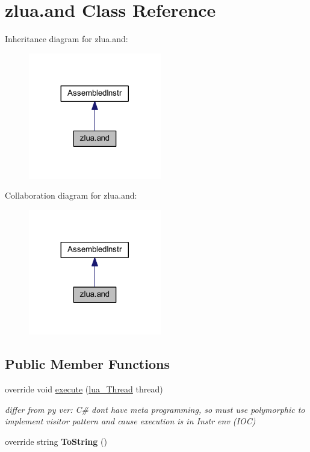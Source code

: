 \hypertarget{classzlua_1_1and}{}\section{zlua.\+and Class Reference}
\label{classzlua_1_1and}


Inheritance diagram for zlua.\+and\+:
\nopagebreak
\begin{figure}[H]
\begin{center}
\leavevmode
\includegraphics[width=164pt]{classzlua_1_1and__inherit__graph}
\end{center}
\end{figure}


Collaboration diagram for zlua.\+and\+:
\nopagebreak
\begin{figure}[H]
\begin{center}
\leavevmode
\includegraphics[width=164pt]{classzlua_1_1and__coll__graph}
\end{center}
\end{figure}
\subsection*{Public Member Functions}
\begin{DoxyCompactItemize}
\item 
override void \mbox{\hyperlink{classzlua_1_1and_ad1ef9d7bf03b778753264a15bbd6ac04}{execute}} (\mbox{\hyperlink{classzlua_1_1lua___thread}{lua\+\_\+\+Thread}} thread)
\begin{DoxyCompactList}\small\item\em differ from py ver\+: C\# dont have meta programming, so must use polymorphic to implement visitor pattern and cause execution is in Instr env (I\+OC) \end{DoxyCompactList}\item 
\mbox{\label{classzlua_1_1and_aa49d463d28c5390025cfaf473c7cefd7}} 
override string {\bfseries To\+String} ()
\end{DoxyCompactItemize}
